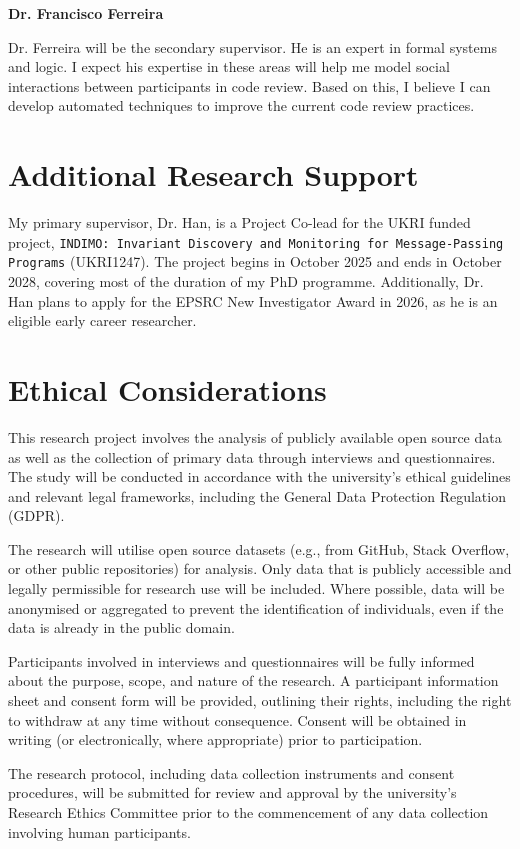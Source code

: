 \documentclass[letterpaper]{article}
\begin{document}
\noindent
{\bf Dr. Francisco Ferreira}

Dr. Ferreira will be the secondary supervisor.
He is an expert in formal systems and logic.
I expect his expertise in these areas will help me model social interactions between participants in code review.
Based on this, I believe I can develop automated techniques to improve the current code review practices.



\section{Additional Research Support}

My primary supervisor, Dr. Han, is a Project Co-lead for the UKRI funded project, {\tt INDIMO: Invariant Discovery and Monitoring for Message-Passing Programs} (UKRI1247).
The project begins in October 2025 and ends in October 2028, covering most of the duration of my PhD programme.
Additionally, Dr. Han plans to apply for the EPSRC New Investigator Award in 2026, as he is an eligible early career researcher.



\section{Ethical Considerations}

This research project involves the analysis of publicly available open source data as well as the collection of primary data through interviews and questionnaires.
The study will be conducted in accordance with the university's ethical guidelines and relevant legal frameworks, including the General Data Protection Regulation (GDPR).

The research will utilise open source datasets (e.g., from GitHub, Stack Overflow, or other public repositories) for analysis.
Only data that is publicly accessible and legally permissible for research use will be included.
Where possible, data will be anonymised or aggregated to prevent the identification of individuals, even if the data is already in the public domain.

Participants involved in interviews and questionnaires will be fully informed about the purpose, scope, and nature of the research.
A participant information sheet and consent form will be provided, outlining their rights, including the right to withdraw at any time without consequence.
Consent will be obtained in writing (or electronically, where appropriate) prior to participation.

The research protocol, including data collection instruments and consent procedures, will be submitted for review and approval by the university’s Research Ethics Committee prior to the commencement of any data collection involving human participants.



\end{document}
